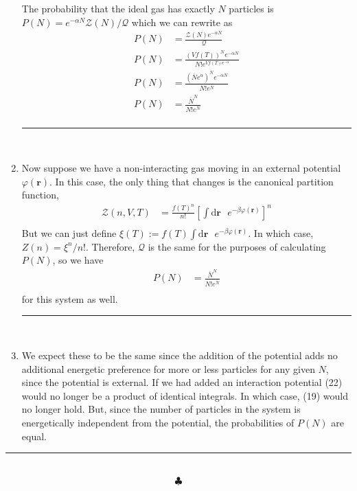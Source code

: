 \documentclass[]{book}
\begin{document}
\begin{enumerate}[1)]
The probability that the ideal gas has exactly $N$ particles is $P(N) = e^{-\alpha N}\mathcal{Z}(N) / \mathcal{Q}$ which we can rewrite as
\begin{equation}
\begin{split}
P(N) & = \frac{\mathcal{Z}(N)e^{-\alpha N}}{\mathcal{Q}} \\
P(N) & = \frac{(Vf(T))^Ne^{-\alpha N}}{N!e^{Vf(T)e^{-\alpha}}} \\
P(N) & = \frac{\left(\overline{N}e^\alpha \right)^Ne^{-\alpha N}}{N! e^{\overline{N}}} \\
P(N) & = \frac{\overline{N}^N}{N! e^{\overline{N}}} \\
\end{split}
\end{equation}
\noindent\rule{15cm}{0.4pt} \\
\item 
Now suppose we have a non-interacting gas moving in an external potential $\varphi(\textbf{r})$. In this case, the only thing that changes is the canonical partition function,
\begin{equation}
\begin{split}
\mathcal{Z}(n,V,T) & = \frac{f(T)^n}{n!} \left[ \int \text{d}\textbf{r}\text{ } e^{-\beta \varphi(\textbf{r})} \right]^n\\
\end{split}
\end{equation}
But we can just define $\xi(T) := f(T)\int \text{d}\textbf{r}\text{ } e^{-\beta \varphi(\textbf{r})} $. In which case, $Z(n) = \xi^n/n!$. Therefore, $\mathcal{Q}$ is the same for the purposes of calculating $P(N)$, so we have
\begin{equation}
\begin{split}
P(N) & = \frac{\overline{N}^N}{N! e^{\overline{N}}} \\
\end{split}
\end{equation}
for this system as well. \\
\noindent\rule{15cm}{0.4pt} \\
\item We expect these to be the same since the addition of the potential adds no additional energetic preference for more or less particles for any given $N$, since the potential is external. If we had added an interaction potential (22) would no longer be a product of identical integrals. In which case, (19) would no longer hold. But, since the number of particles in the system is energetically independent from the potential, the probabilities of $P(N)$ are equal. 
\end{enumerate}
\noindent\rule{15cm}{0.4pt} \\
$$\clubsuit$$
\end{document}
